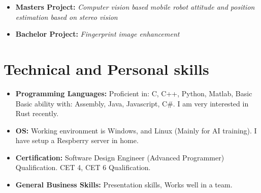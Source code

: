 \documentclass[11pt,a4paper,sans]{moderncv}        %
\begin{document}
\begin{itemize}

\item{\textbf{Masters Project:} \textit{Computer vision based mobile robot attitude and position estimation based on stereo vision}

\vspace{3pt}

}

\item{\textbf{Bachelor Project:} \textit{Fingerprint image enhancement}

\vspace{3pt}}
\end{itemize}

\section{Technical and Personal skills}

\vspace{6pt}

\begin{itemize}

\item \textbf{Programming Languages:} Proficient in: C, C++, Python, Matlab, Basic \\ Basic ability with: Assembly, Java, Javascript, C\#. I am very interested in Rust recently.

\vspace{6pt}

\item \textbf{OS:} Working environment is Windows, and Linux (Mainly for AI training). I have setup a Respberry server in home.

\vspace{6pt}

\item \textbf{Certification:} Software Design Engineer (Advanced Programmer) Qualification. CET 4, CET 6 Qualification.

\vspace{6pt}

\item \textbf{General Business Skills:} Presentation skills, Works well in a team.

\end{itemize}
\end{document}
